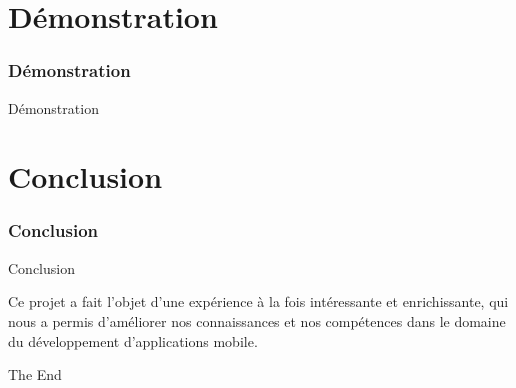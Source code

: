 \documentclass{beamer}
\begin{document}
\section{Démonstration}

\begin{frame}
\frametitle{Démonstration}
	\Huge{\centerline{Démonstration}}
\end{frame}

\section{Conclusion}


\begin{frame}
\frametitle{Conclusion}
	\Huge{\centerline{Conclusion}}
	Ce projet a fait l'objet d'une expérience à  la fois intéressante et enrichissante, qui nous a permis d'améliorer nos connaissances et nos compétences dans le domaine du développement d'applications mobile.
\end{frame}

\begin{frame}
\Huge{\centerline{The End}}
\end{frame}

\end{document}

